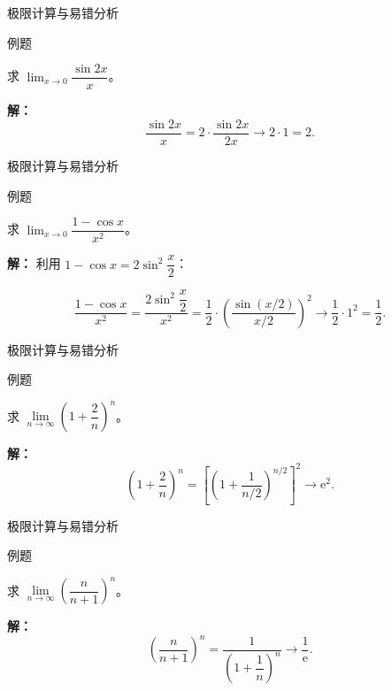 \documentclass[aspectratio=169,10pt,fontset=fandol]{ctexbeamer}
\newcommand{\ee}{\mathrm{e}}
\begin{document}
\begin{frame}[t,fragile]{极限计算与易错分析}
\normalsize
\begin{block}{例题}
{\normalsize
求 \(\lim_{x \to 0} \dfrac{\sin 2x}{x}\)。


}
\end{block}
\pause
{\normalsize
\textbf{解：}
\[

\dfrac{\sin 2x}{x} = 2 \cdot \dfrac{\sin 2x}{2x} \to 2 \cdot 1 = 2.

\]


}
\end{frame}
\begin{frame}[t,fragile]{极限计算与易错分析}
\normalsize
\begin{block}{例题}
{\normalsize
求 \(\lim_{x \to 0} \dfrac{1 - \cos x}{x^2}\)。


}
\end{block}
\pause
{\normalsize
\textbf{解：}
利用 \(1 - \cos x = 2 \sin^2 \dfrac{x}{2}\)：

\[

\dfrac{1 - \cos x}{x^2} = \dfrac{2 \sin^2 \dfrac{x}{2}}{x^2} = \dfrac{1}{2} \cdot \left( \dfrac{\sin (x/2)}{x/2} \right)^2 \to \dfrac{1}{2} \cdot 1^2 = \dfrac{1}{2}.

\]


}
\end{frame}
\begin{frame}[t,fragile]{极限计算与易错分析}
\normalsize
\begin{block}{例题}
{\normalsize
求 \(\lim\limits_{n\to\infty} \left(1 + \dfrac{2}{n}\right)^n\)。


}
\end{block}
\pause
{\normalsize
\textbf{解：}
\[

\left(1 + \dfrac{2}{n}\right)^n = \left[\left(1 + \dfrac{1}{n/2}\right)^{n/2}\right]^2 \to \ee^2.

\]


}
\end{frame}
\begin{frame}[t,fragile]{极限计算与易错分析}
\normalsize
\begin{block}{例题}
{\normalsize
求 \(\lim\limits_{n\to\infty} \left(\dfrac{n}{n+1}\right)^n\)。


}
\end{block}
\pause
{\normalsize
\textbf{解：}
\[

\left(\dfrac{n}{n+1}\right)^n = \dfrac{1}{\left(1 + \dfrac{1}{n}\right)^n} \to \dfrac{1}{\ee}.

\]


}
\end{frame}
\end{document}
